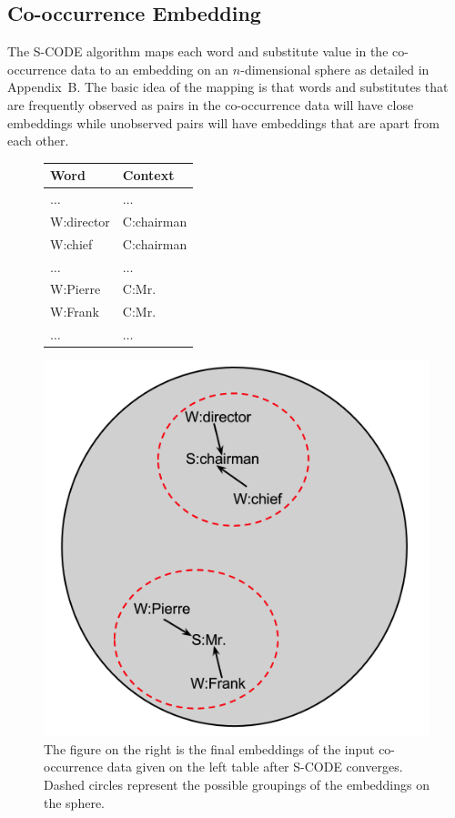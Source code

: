 \subsection{Co-occurrence Embedding}
\label{sec:embedding}
The S-CODE algorithm maps each word and substitute value in the
co-occurrence data to an embedding on an $n$-dimensional sphere as
detailed in Appendix~B.  The basic idea of the mapping is that words
and substitutes that are frequently observed as pairs in the
co-occurrence data will have close embeddings while unobserved pairs
will have embeddings that are apart from each other.
\begin{figure}[ht]
\centering
  \begin{minipage}[c]{0.38\textwidth}
    \begin{tabular}{|l|l|}
    \hline
    \textbf{Word} & \textbf{Context} \\
    \hline
    $\hdots$&$\hdots$\\
    W:director & C:chairman \\
    W:chief & C:chairman \\
    $\hdots$&$\hdots$\\
    W:Pierre & C:Mr. \\
    W:Frank & C:Mr. \\
    $\hdots$&$\hdots$\\
    \hline
  \end{tabular}
  \end{minipage}
  \begin{minipage}[c]{0.48\textwidth}
    \includegraphics[height=\textwidth]{scode-ex.png}
  \end{minipage}
  \caption{The figure on the right is the final embeddings of the
    input co-occurrence data given on the left table after S-CODE
    converges.  Dashed circles represent the possible groupings of the
    embeddings on the sphere.}
  \label{fig:scodeexample}
\end{figure}

